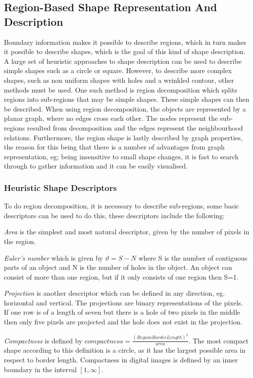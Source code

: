 \subsection{Region-Based Shape Representation And Description}
Boundary information makes it possible to describe regions, which in turn makes it possible to describe shapes, which is the goal of this kind of shape description. A large set of heuristic approaches to shape description can be used to describe simple shapes such as a circle or square. However, to describe more complex shapes, such as non uniform shapes with holes and a wrinkled contour, other methods must be used. One such method is region decomposition which splits regions into sub-regions that may be simple shapes. These simple shapes can then be described. When using region decomposition, the objects are represented by a planar graph, where no edges cross each other. The nodes represent the sub-regions resulted from decomposition and the edges represent the neighbourhood relations.
Furthermore, the region shape is lastly described by graph properties, the reason for this being that there is a number of advantages from graph representation, eg; being insensitive to small shape changes, it is fast to search through to gather information and it can be easily visualised.

\subsubsection{Heuristic Shape Descriptors}\label{ssc:heuristic_descr}
To do region decomposition, it is necessary to describe sub-regions, some basic descriptors can be used to do this, these descriptors include the following:

\textit{Area} is the simplest and most natural descriptor, given by the number of pixels in the region.

\textit{Euler's number} which is given by $\vartheta=S-N$ where S is the number of contiguous parts of an object and N is the number of holes in the object. An object can consist of more than one region, but if it only consists of one region then S=1.

\textit{Projection} is another descriptor which can be defined in any direction, eg. horizontal and vertical. The projections are binary representations of the pixels. If one row is of a length of seven but there is a hole of two pixels in the middle then only five pixels are projected and the hole does not exist in the projection.

\textit{Compactness} is defined by $compactness=\frac{(RegionBorderLength)^2}{area}$. The most compact shape according to this definition is a
circle, as it has the largest possible area in respect to border length. Compactness in digital images is defined by an inner boundary in the interval $[1,\infty]$.

